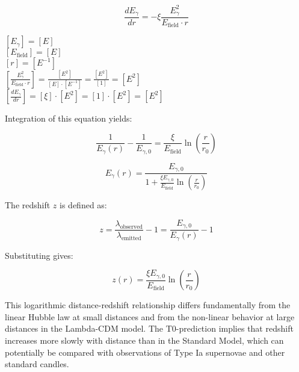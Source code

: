 \documentclass[12pt,a4paper]{article}
\theoremstyle{definition}
\begin{document}
	\begin{equation}
		\boxed{\frac{dE_\gamma}{dr} = -\xi \frac{E_\gamma^2}{E_{\text{field}} \cdot r}}
	\end{equation}
	
	\begin{einheitencheck}
		$[E_\gamma] = [E]$\\
		$[E_{\text{field}}] = [E]$\\
		$[r] = [E^{-1}]$\\
		$[\frac{E_\gamma^2}{E_{\text{field}} \cdot r}] = \frac{[E^2]}{[E] \cdot [E^{-1}]} = \frac{[E^2]}{[1]} = [E^2]$\\
		$[\frac{dE_\gamma}{dr}] = [\xi] \cdot [E^2] = [1] \cdot [E^2] = [E^2]$ \checkmark
	\end{einheitencheck}
	
	Integration of this equation yields:
	
	\begin{equation}
		\frac{1}{E_\gamma(r)} - \frac{1}{E_{\gamma,0}} = \frac{\xi}{E_{\text{field}}} \ln\left(\frac{r}{r_0}\right)
	\end{equation}
	
	\begin{equation}
		E_\gamma(r) = \frac{E_{\gamma,0}}{1 + \frac{\xi E_{\gamma,0}}{E_{\text{field}}} \ln\left(\frac{r}{r_0}\right)}
	\end{equation}
	
	The redshift $z$ is defined as:
	
	\begin{equation}
		z = \frac{\lambda_{\text{observed}}}{\lambda_{\text{emitted}}} - 1 = \frac{E_{\gamma,0}}{E_\gamma(r)} - 1
	\end{equation}
	
	Substituting gives:
	
	\begin{equation}
		\boxed{z(r) = \frac{\xi E_{\gamma,0}}{E_{\text{field}}} \ln\left(\frac{r}{r_0}\right)}
	\end{equation}
	
	\begin{wichtig}
		This logarithmic distance-redshift relationship differs fundamentally from the linear Hubble law at small distances and from the non-linear behavior at large distances in the Lambda-CDM model. The T0-prediction implies that redshift increases more slowly with distance than in the Standard Model, which can potentially be compared with observations of Type Ia supernovae and other standard candles.
	\end{wichtig}
	
\end{document}
